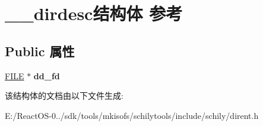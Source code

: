 \hypertarget{struct____dirdesc}{}\section{\+\_\+\+\_\+dirdesc结构体 参考}
\label{struct____dirdesc}
\subsection*{Public 属性}
\begin{DoxyCompactItemize}
\item 
\mbox{\label{struct____dirdesc_a43a9a61a543a8005125608f34634ac63}} 
\hyperlink{struct__iobuf}{F\+I\+LE} $\ast$ {\bfseries dd\+\_\+fd}
\end{DoxyCompactItemize}


该结构体的文档由以下文件生成\+:\begin{DoxyCompactItemize}
\item 
E\+:/\+React\+O\+S-\/0../sdk/tools/mkisofs/schilytools/include/schily/dirent.\+h\end{DoxyCompactItemize}
